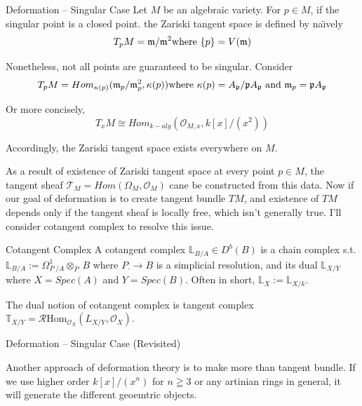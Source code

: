 \documentclass{article}
\begin{document}
\begin{example}{Deformation -- Singular Case}{}
Let $M$ be an algebraic variety. For $p\in M$, if the singular point is a closed point.  the Zariski tangent space is defined by na\"{\i}vely
\[
T_p M = \mathfrak{m}/\mathfrak{m}^2 \hfill \text{where $\{p\}=V(\mathfrak{m})$}
\]

Nonetheless, not all points are guaranteed to be singular. Consider \\

\[T_p M = Hom_{\kappa(p)}(\mathfrak{m}_p/\mathfrak{m}_p^2, \kappa(p))
\hfill \text{where $\kappa(p) = A_{\mathfrak{p}}/\mathfrak{p} A_{\mathfrak{p}}$ and $\mathfrak{m}_p = \mathfrak{p} A_{\mathfrak{p}}$}
\]

Or more concisely, \\
\[ T_x M \cong Hom_{k-alg} (\mathcal{O}_{M,x}, k[x]/(x^2)) \]

Accordingly, the Zariski tangent space exists everywhere on $M$. 
\end{example}

\noindent
As a result of existence of Zariski tangent space at every point $p\in M$, 
the tangent sheaf $\mathcal{T}_M = Hom(\mathcal{\Omega}_M, \mathcal{O}_M)$ cane be constructed from this data.
Now if our goal of deformation is to create tangent bundle $TM$, 
and existence of $TM$ depends only if the tangent sheaf is locally free, which isn't generally true. 
I'll consider cotangent complex to resolve this issue. \\


\begin{definition}{Cotangent Complex}{}
A cotangent complex $\mathbb{L}_{B/A}\in D^b (B)$ is a chain complex s.t. 
$\mathbb{L}_{B/A}:= \Omega_{P_\cdot/A}^1 \otimes_{P_\cdot} B$ where $P_\cdot \to B$ is a simplicial resolution,
and its dual $\mathbb{L}_{X/Y}$ where $X=Spec(A)$ and $Y=Spec(B)$. Often in short, $\mathbb{L}_X := \mathbb{L}_{X/k}$.

The dual notion of cotangent complex is tangent complex 
$\mathbb{T}_{X/Y} = \mathcal{R}\mathrm{Hom}_{\mathcal{O}_X} (L_{X/Y},\mathcal{O}_X)$.
\end{definition}


\begin{example}{Deformation -- Singular Case (Revisited)}{}
\end{example}



\noindent
Another approach of deformation theory is to make more than tangent bundle.
If we use higher order $k[x]/(x^n)$ for $n\geqq 3$ or any artinian rings in general, it will generate the different geoemtric objects.
\end{document}
